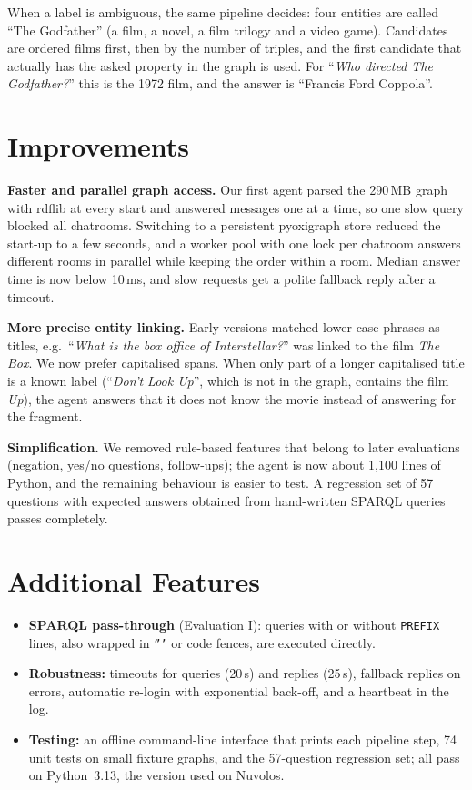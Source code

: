 \documentclass{article}
\begin{document}
When a label is ambiguous, the same pipeline decides: four entities are called ``The Godfather'' (a film, a novel, a film trilogy and a video game). Candidates are ordered films first, then by the number of triples, and the first candidate that actually has the asked property in the graph is used. For ``\textit{Who directed The Godfather?}'' this is the 1972 film, and the answer is ``Francis Ford Coppola''.

\section{Improvements}

\textbf{Faster and parallel graph access.} Our first agent parsed the 290\,MB graph with rdflib at every start and answered messages one at a time, so one slow query blocked all chatrooms. Switching to a persistent pyoxigraph store reduced the start-up to a few seconds, and a worker pool with one lock per chatroom answers different rooms in parallel while keeping the order within a room. Median answer time is now below 10\,ms, and slow requests get a polite fallback reply after a timeout.

\textbf{More precise entity linking.} Early versions matched lower-case phrases as titles, e.g.\ ``\textit{What is the box office of Interstellar?}'' was linked to the film \textit{The Box}. We now prefer capitalised spans. When only part of a longer capitalised title is a known label (``\textit{Don't Look Up}'', which is not in the graph, contains the film \textit{Up}), the agent answers that it does not know the movie instead of answering for the fragment.

\textbf{Simplification.} We removed rule-based features that belong to later evaluations (negation, yes/no questions, follow-ups); the agent is now about 1,100 lines of Python, and the remaining behaviour is easier to test. A regression set of 57 questions with expected answers obtained from hand-written SPARQL queries passes completely.

\section{Additional Features}

\begin{itemize}
    \item \textbf{SPARQL pass-through} (Evaluation I): queries with or without \texttt{PREFIX} lines, also wrapped in \texttt{'''} or code fences, are executed directly.
    \item \textbf{Robustness:} timeouts for queries (20\,s) and replies (25\,s), fallback replies on errors, automatic re-login with exponential back-off, and a heartbeat in the log.
    \item \textbf{Testing:} an offline command-line interface that prints each pipeline step, 74 unit tests on small fixture graphs, and the 57-question regression set; all pass on Python~3.13, the version used on Nuvolos.
\end{itemize}
\end{document}
